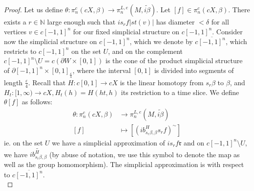 \documentclass[a4paper,11pt]{article}
\theoremstyle{definition}
\theoremstyle{plain}
\theoremstyle{remark}
\begin{document}
{\begin{proof}
Let us define $\theta: \pi_{n}^c(cX,\beta)\rightarrow \pi_{n}^{L,e}(M,\widetilde{i\beta})$. Let $[f]\in \pi_{n}^c(cX,\beta)$. There exists a $r\in \mathbb{N}$ large enough such that $is_{r}f|st(v)|$ has diameter $<\delta$ for all vertices $v\in c[-1,1]^n$ for our fixed simplicial structure on $c[-1,1]^n$. Consider now the simplicial structure on $c[-1,1]^n$, which we denote by $c\overline{[-1,1]^n}$, which restricts to $c[-1,1]^n$ on the set $U$, and on the complement $c[-1,1]^n\setminus U = c(\partial W \times [0,1])$ is the cone of the product simplicial structure of $\partial{[-1,1]^n} \times [0,1]_{\frac{\varepsilon}{4}}$, where the interval $[0,1]$ is divided into segments of length $\frac{\varepsilon}{4}$. Recall that $H: c[0,1]\rightarrow cX$ is the linear homotopy from $s_{r}\beta$ to $\beta$, and $H_{t}: [1,\infty)\rightarrow cX, H_{t}(h) = H(ht,h)$ its restriction to a time slice. We define $\theta[f]$ as follows:
\begin{align*}
\theta: \pi_{n}^c(cX,\beta)&\rightarrow \pi_{n}^{L,e}(M,\widetilde{i\beta})\\
[f] &\mapsto [(ib^H_{s_{r}\beta,\beta}s_{r}f)^{\sim}]
\end{align*}
ie. on the set $U$ we have a simplicial approximation of $is_{r}f\mathfrak{r}$ and on $c[-1,1]^n\setminus U$, we have $\widetilde{i b^H_{s_{r}\beta,\beta}}$ (by abuse of notation, we use this symbol to denote the map as well as the group homomorphism). The simplicial approximation is with respect to $c\overline{[-1,1]^n}$. \\




\end{proof}}
\end{document}
